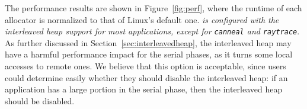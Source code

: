 

The performance results are shown in Figure~\ref{fig:perf}, where the runtime of each allocator is normalized to that of Linux's default one. \textit{\NM{} is configured with the interleaved heap support for most applications, except for \texttt{canneal} and \texttt{raytrace}}. As further discussed in Section~\ref{sec:interleavedheap}, the interleaved heap may have a harmful performance impact for the serial phases, as it turns some local accesses to remote ones. %
We believe that this option is acceptable, since users could determine easily whether they should disable the interleaved heap: if an application has a large portion in the serial phase, then the interleaved heap should be disabled. 




